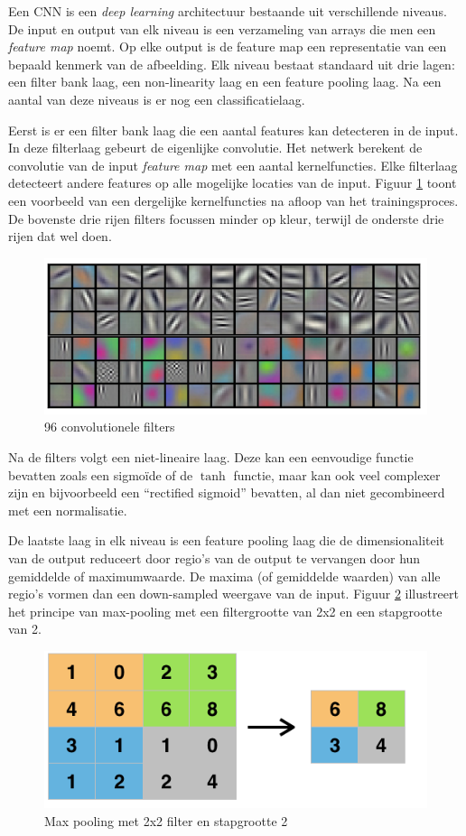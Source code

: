 Een CNN is een \emph{deep learning} architectuur bestaande uit verschillende niveaus. De input en output van elk niveau is een verzameling van arrays die men een \emph{feature map} noemt. Op elke output is de feature map een representatie van een bepaald kenmerk van de afbeelding. Elk niveau bestaat standaard uit drie lagen: een filter bank laag, een non-linearity laag en een feature pooling laag. Na een aantal van deze niveaus is er nog een classificatielaag.

Eerst is er een filter bank laag die een aantal features kan detecteren in de input. In deze filterlaag gebeurt de eigenlijke convolutie. Het netwerk berekent de convolutie van de input \emph{feature map} met een aantal kernelfuncties. Elke filterlaag detecteert andere features op alle mogelijke locaties van de input. Figuur \ref{fig:cnnfilters} toont een voorbeeld van een dergelijke kernelfuncties na afloop van het trainingsproces. De bovenste drie rijen filters focussen minder op kleur, terwijl de onderste drie rijen dat wel doen.

\begin{figure}[tb]
    \centering
    \includegraphics[width=.7\textwidth]{Images/cnnfilters.png}
    \caption{96 convolutionele filters\cite{Krizhevsky2012a}}
    \label{fig:cnnfilters}
\end{figure}

Na de filters volgt een niet-lineaire laag. Deze kan een eenvoudige functie bevatten zoals een sigmo\"ide of de $\tanh$ functie, maar kan ook veel complexer zijn en bijvoorbeeld een ``rectified sigmoid'' bevatten, al dan niet gecombineerd met een normalisatie.

De laatste laag in elk niveau is een feature pooling laag die de dimensionaliteit van de output reduceert door regio's van de output te vervangen door hun gemiddelde of maximumwaarde. De maxima (of gemiddelde waarden) van alle regio's vormen dan een down-sampled weergave van de input. Figuur \ref{fig:maxpool} illustreert het principe van max-pooling met een filtergrootte van 2x2 en een stapgrootte van 2. 

\begin{figure}[tb]
    \centering
    \includegraphics[width=0.6\linewidth]{Images/maxpool.png}
    \caption{Max pooling met 2x2 filter en stapgrootte 2}
    \label{fig:maxpool}
\end{figure}

